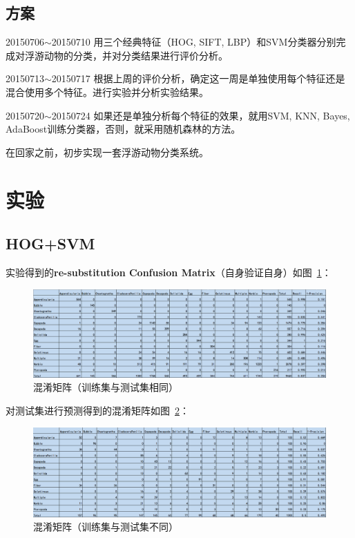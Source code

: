 \documentclass[12pt]{article}
\begin{document}
\subsection{方案}

20150706$\sim$20150710 用三个经典特征（HOG, SIFT, LBP）和SVM分类器分别完成对浮游动物的分类，并对分类结果进行评价分析。

20150713$\sim$20150717 根据上周的评价分析，确定这一周是单独使用每个特征还是混合使用多个特征。进行实验并分析实验结果。

20150720$\sim$20150724 如果还是单独分析每个特征的效果，就用SVM, KNN, Bayes, AdaBoost训练分类器，否则，就采用随机森林的方法。

在回家之前，初步实现一套浮游动物分类系统。

\section{实验}

\subsection{HOG+SVM}

实验得到的\textbf{re-substitution Confusion Matrix}（自身验证自身）如图~\ref{fig: Train-CM-HOG-SVM}：
\begin{figure}[!ht]
\centering
\includegraphics[width=1.0\linewidth]{Train-CM-HOG-SVM}
\caption{混淆矩阵（训练集与测试集相同）}
\label{fig: Train-CM-HOG-SVM}
\end{figure}

对测试集进行预测得到的混淆矩阵如图~\ref{fig: Test-CM-HOG-SVM}：
\begin{figure}[!ht]
\centering
\includegraphics[width=1.0\linewidth]{Test-CM-HOG-SVM}
\caption{混淆矩阵（训练集与测试集不同）}
\label{fig: Test-CM-HOG-SVM}
\end{figure}
\end{document}
